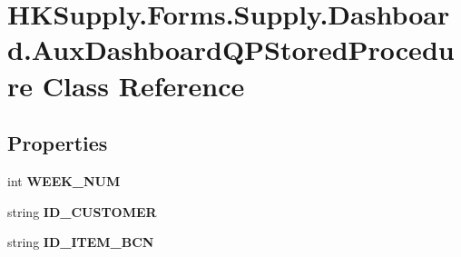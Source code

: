 \hypertarget{class_h_k_supply_1_1_forms_1_1_supply_1_1_dashboard_1_1_aux_dashboard_q_p_stored_procedure}{}\section{H\+K\+Supply.\+Forms.\+Supply.\+Dashboard.\+Aux\+Dashboard\+Q\+P\+Stored\+Procedure Class Reference}
\label{class_h_k_supply_1_1_forms_1_1_supply_1_1_dashboard_1_1_aux_dashboard_q_p_stored_procedure}
\subsection*{Properties}
\begin{DoxyCompactItemize}
\item 
\mbox{\label{class_h_k_supply_1_1_forms_1_1_supply_1_1_dashboard_1_1_aux_dashboard_q_p_stored_procedure_aa1342f183f20561163219fad581bf57e}} 
int {\bfseries W\+E\+E\+K\+\_\+\+N\+UM}
\item 
\mbox{\label{class_h_k_supply_1_1_forms_1_1_supply_1_1_dashboard_1_1_aux_dashboard_q_p_stored_procedure_ad579a1b2b046ab1a124667db33617073}} 
string {\bfseries I\+D\+\_\+\+C\+U\+S\+T\+O\+M\+ER}
\item 
\mbox{\label{class_h_k_supply_1_1_forms_1_1_supply_1_1_dashboard_1_1_aux_dashboard_q_p_stored_procedure_a8dcf5e0fb122c5cccbf65cc1a86f373d}} 
string {\bfseries I\+D\+\_\+\+I\+T\+E\+M\+\_\+\+B\+CN}
\item 
\mbox{\label{class_h_k_supply_1_1_forms_1_1_supply_1_1_dashboard_1_1_aux_dashboard_q_p_stored_procedure_ac92b0d2b25f344d15cc87edff4274b36}} 

\end{DoxyCompactItemize}
